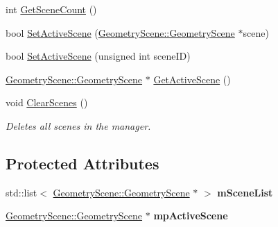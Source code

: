 \begin{DoxyCompactItemize}
int \mbox{\hyperlink{class_geometry_engine_1_1_scene_manager_a1dc46b5707a779a3fcc3881bb7c8f3f6}{Get\+Scene\+Count}} ()
\item 
bool \mbox{\hyperlink{class_geometry_engine_1_1_scene_manager_a0d493622807bb55d8e33a313ca61a3db}{Set\+Active\+Scene}} (\mbox{\hyperlink{class_geometry_engine_1_1_geometry_scene_1_1_geometry_scene}{Geometry\+Scene\+::\+Geometry\+Scene}} $\ast$scene)
\item 
bool \mbox{\hyperlink{class_geometry_engine_1_1_scene_manager_a2a188fd362d750afeca3aa79102fc9de}{Set\+Active\+Scene}} (unsigned int scene\+ID)
\item 
\mbox{\hyperlink{class_geometry_engine_1_1_geometry_scene_1_1_geometry_scene}{Geometry\+Scene\+::\+Geometry\+Scene}} $\ast$ \mbox{\hyperlink{class_geometry_engine_1_1_scene_manager_a8d9620773e7ee65a82aa13bb4a1a1fdf}{Get\+Active\+Scene}} ()
\item 
\mbox{\label{class_geometry_engine_1_1_scene_manager_ae7eaea410cbd27d602cefaf388d76d2d}} 
void \mbox{\hyperlink{class_geometry_engine_1_1_scene_manager_ae7eaea410cbd27d602cefaf388d76d2d}{Clear\+Scenes}} ()
\begin{DoxyCompactList}\small\item\em Deletes all scenes in the manager. \end{DoxyCompactList}\end{DoxyCompactItemize}
\subsection*{Protected Attributes}
\begin{DoxyCompactItemize}
\item 
\mbox{\label{class_geometry_engine_1_1_scene_manager_a8b458621cdce072650b3e731710d52e7}} 
std\+::list$<$ \mbox{\hyperlink{class_geometry_engine_1_1_geometry_scene_1_1_geometry_scene}{Geometry\+Scene\+::\+Geometry\+Scene}} $\ast$ $>$ {\bfseries m\+Scene\+List}
\item 
\mbox{\label{class_geometry_engine_1_1_scene_manager_ac33c3f2458f3e4e120a370916102a545}} 
\mbox{\hyperlink{class_geometry_engine_1_1_geometry_scene_1_1_geometry_scene}{Geometry\+Scene\+::\+Geometry\+Scene}} $\ast$ {\bfseries mp\+Active\+Scene}
\end{DoxyCompactItemize}



